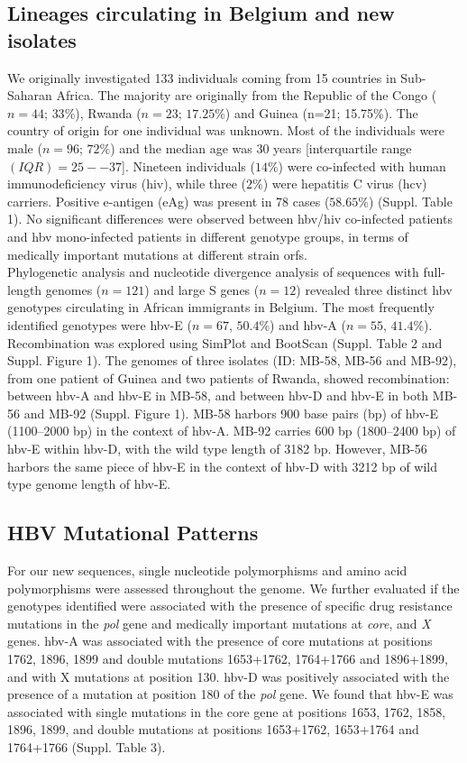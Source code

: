 \subsection{Lineages circulating in Belgium and new isolates}
We originally investigated 133 individuals coming from 15 countries in Sub-Saharan Africa.
The majority are originally from the Republic of the Congo ($n=44$; $33\%$), Rwanda ($n=23$; $17.25\%$) and Guinea (n=21; 15.75\%).
The country of origin for one individual was unknown.
Most of the individuals were male ($n=96$; $72\%$) and the median age was 30 years [interquartile range $(IQR) = 25--37$].
Nineteen individuals ($14\%$) were co-infected with human immunodeficiency virus (\gls{hiv}), while three ($2\%$) were hepatitis C virus (\gls{hcv}) carriers.
Positive e-antigen (eAg) was present in 78 cases ($58.65\%$) (Suppl. Table 1).
No significant differences were observed between \gls{hbv}/\gls{hiv} co-infected patients and \gls{hbv} mono-infected patients in different genotype groups, in terms of medically important mutations at different strain \gls{orf}s.\\

Phylogenetic analysis and nucleotide divergence analysis of sequences with full-length genomes ($n=121$) and large S genes ($n=12$) revealed three distinct \gls{hbv} genotypes circulating in African immigrants in Belgium.
The most frequently identified genotypes were \gls{hbv}-E ($n=67$, $50.4\%$) and \gls{hbv}-A ($n=55$, $41.4\%$).
Recombination was explored using SimPlot and BootScan (Suppl. Table 2 and Suppl. Figure 1).
The genomes of three isolates (ID: MB-58, MB-56 and MB-92), from one patient of Guinea and two patients of Rwanda, showed recombination: between \gls{hbv}-A and \gls{hbv}-E in MB-58, and between \gls{hbv}-D and \gls{hbv}-E in both MB-56 and MB-92 (Suppl. Figure 1).
MB-58 harbors 900 base pairs (bp) of \gls{hbv}-E (1100--2000 bp) in the context of \gls{hbv}-A.
MB-92 carries 600 bp (1800--2400 bp) of \gls{hbv}-E within \gls{hbv}-D, with the wild type length of 3182 bp.
However, MB-56 harbors the same piece of \gls{hbv}-E in the context of \gls{hbv}-D with 3212 bp of wild type genome length of \gls{hbv}-E.

\subsection{HBV Mutational Patterns}
For our new sequences, single nucleotide polymorphisms and amino acid polymorphisms were assessed throughout the genome.
We further evaluated if the genotypes identified were associated with the presence of specific drug resistance mutations in the \textit{pol} gene and medically important mutations at \textit{core}, and \textit{X} genes.
\gls{hbv}-A was associated with the presence of core mutations at positions 1762, 1896, 1899 and double mutations 1653+1762, 1764+1766 and 1896+1899, and with X mutations at position 130.
\gls{hbv}-D was positively associated with the presence of a mutation at position 180 of the \textit{pol} gene.
We found that \gls{hbv}-E was associated with single mutations in the core gene at positions 1653, 1762, 1858, 1896, 1899, and double mutations at positions 1653+1762, 1653+1764 and 1764+1766 (Suppl. Table 3).\\


